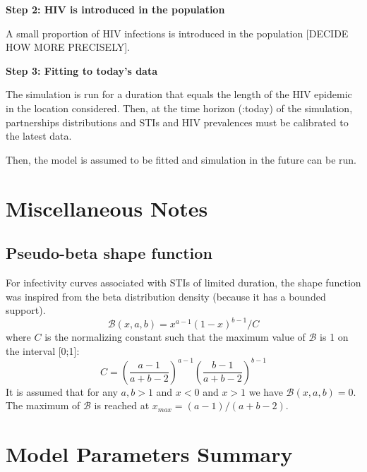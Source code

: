 \documentclass[11pt, onecolumn]{article}
\begin{document}
\textbf{Step 2: HIV is introduced in the population}

A small proportion of HIV infections is introduced in the population [DECIDE HOW MORE PRECISELY].

\textbf{Step 3: Fitting to today's data}

The simulation is run for a duration that equals the length of the HIV epidemic in the location considered. Then, at the time horizon (:today) of the simulation, partnerships distributions and STIs and HIV prevalences must be calibrated to the latest data.

Then, the model is assumed to be fitted and simulation in the future can be run.








\section{Miscellaneous Notes}

\subsection{Pseudo-beta shape function} \label{sec:pseudobeta}

For infectivity curves associated with STIs of limited duration, the shape function was inspired from the beta distribution density (because it has a bounded support).
$$\mathcal{B}(x,a,b) = x^{a-1}(1-x)^{b-1}/C$$
where $C$ is the normalizing constant such that the maximum value of $\mathcal{B}$ is 1 on the interval [0;1]:
$$C=\left(\frac{a-1}{a+b-2}\right)^{a-1}\left(\frac{b-1}{a+b-2}\right)^{b-1}$$
It is assumed that for any $a,b>1$ and  $x<0$ and $x>1$ we have $\mathcal{B}(x,a,b)=0$.
The maximum of $\mathcal{B}$ is reached at $x_{max}=(a-1)/(a+b-2)$.


\newpage



\section{Model Parameters Summary}


\end{document}
